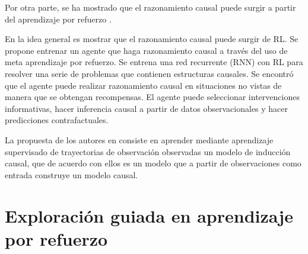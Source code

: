 Por otra parte, se ha mostrado que el razonamiento causal puede surgir a partir del aprendizaje por refuerzo \cite{dasgupta2019causal, madumal2019explainable, bengio2019metatransfer}.


En \cite{dasgupta2019causal} la idea general es mostrar que el razonamiento
causal puede surgir de RL. 
Se propone entrenar un agente que haga razonamiento causal a través del uso de  meta aprendizaje por refuerzo. Se entrena una red recurrente (RNN) con RL para resolver una serie de problemas que contienen estructuras causales.
Se encontró que el agente puede realizar razonamiento causal en situaciones
no vistas de manera que se obtengan recompensas. El agente
puede seleccionar intervenciones informativas, hacer inferencia causal a partir
de datos observacionales y hacer predicciones contrafactuales.



La propuesta de los autores en \cite{nair2019causal} consiste en
aprender mediante aprendizaje supervisado de trayectorias 
de observación observadas un modelo de inducción causal, que de acuerdo con ellos es un modelo que a partir
de observaciones como entrada construye un modelo causal.


\section{Exploración guiada en aprendizaje por refuerzo}

